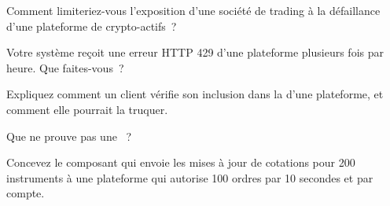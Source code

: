 \begin{interviewq}\label{iq:m3:centralised-exchanges:2}
Comment limiteriez-vous l'exposition d'une société de trading à la défaillance d'une plateforme de crypto-actifs~?
\end{interviewq}

\begin{interviewq}\label{iq:m3:centralised-exchanges:3}
Votre système reçoit une erreur HTTP 429 d'une plateforme plusieurs fois par heure. Que faites-vous~?
\end{interviewq}

\begin{interviewq}\label{iq:m3:centralised-exchanges:4}
Expliquez comment un client vérifie son inclusion dans la  d'une plateforme, et
comment elle pourrait la truquer.
\end{interviewq}

\begin{interviewq}\label{iq:m3:centralised-exchanges:5}
Que ne prouve pas une ~?
\end{interviewq}

\begin{interviewq}\label{iq:m3:centralised-exchanges:6}
Concevez le composant qui envoie les mises à jour de cotations pour 200 instruments à une plateforme
qui autorise 100 ordres par 10 secondes et par compte.
\end{interviewq}
